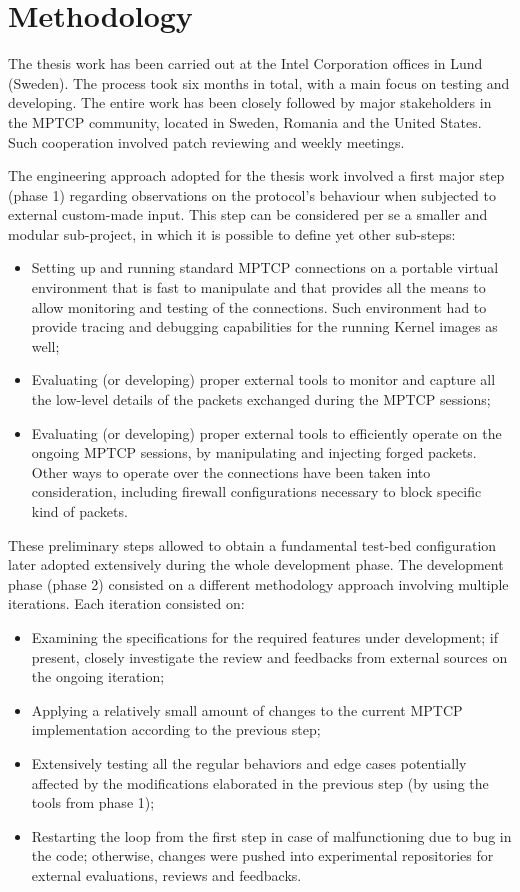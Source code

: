 \section{Methodology}
The thesis work has been carried out at the Intel Corporation offices in Lund (Sweden). The process took six months in total, with a main focus on testing and developing. The entire work has been closely followed by major stakeholders in the MPTCP community, located in Sweden, Romania and the United States. Such cooperation involved patch reviewing and weekly meetings.

The engineering approach adopted for the thesis work involved a first major step (phase 1) regarding observations on the protocol's behaviour when subjected to external custom-made input. This step can be considered per se a smaller and modular sub-project, in which it is possible to define yet other sub-steps:

\begin{itemize}
    \item Setting up and running standard MPTCP connections on a portable virtual environment that is fast to manipulate and that provides all the means to allow monitoring and testing of the connections. Such environment had to provide tracing and debugging capabilities for the running Kernel images as well;
    \item Evaluating (or developing) proper external tools to monitor and capture all the low-level details of the packets exchanged during the MPTCP sessions;
    \item Evaluating (or developing) proper external tools to efficiently operate on the ongoing MPTCP sessions, by manipulating and injecting forged packets. Other ways to operate over the connections have been taken into consideration, including firewall configurations necessary to block specific kind of packets.
\end{itemize}

These preliminary steps allowed to obtain a fundamental test-bed configuration later adopted extensively during the whole development phase. 
The development phase (phase 2) consisted on a different methodology approach involving multiple iterations. Each iteration consisted on:

\begin{itemize}
    \item Examining the specifications for the required features under development; if present, closely investigate the review and feedbacks from external sources on the ongoing iteration;
    \item Applying a relatively small amount of changes to the current MPTCP implementation according to the previous step;
    \item Extensively testing all the regular behaviors and edge cases potentially affected by the modifications elaborated in the previous step (by using the tools from phase 1);
    \item Restarting the loop from the first step in case of malfunctioning due to bug in the code; otherwise, changes were pushed into experimental repositories for external evaluations, reviews and feedbacks.
\end{itemize}

